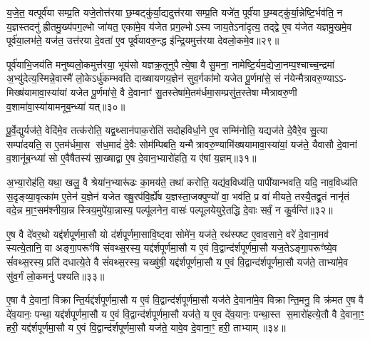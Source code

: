 य॒जे॒त॒ यत्पूर्व॑या सम्प्र॒ति यजे॒तोत्त॑रया छ॒म्बट्कु॑र्या॒द्यदुत्त॑रया सम्प्र॒ति यजे॑त॒ पूर्व॑या छ॒म्बट्कु॑र्या॒न्नेष्टि॒र्भव॑ति॒ न य॒ज्ञस्तदनु॑ ह्रीतमु॒ख्य॑पग॒ल्भो जा॑यत॒ एका॑मे॒व य॑जेत प्रग॒ल्भोऽस्य जाय॒तेऽना॑दृत्य॒ तद्द्वे ए॒व य॑जेत यज्ञमु॒खमे॒व पूर्व॑या॒लभ॑ते॒ यज॑त॒ उत्त॑रया दे॒वता॑ ए॒व पूर्व॑यावरु॒न्द्ध इ॑न्द्रि॒यमुत्त॑रया देवलो॒कमे॒व॥२९॥

पूर्व॑याभि॒जय॑ति मनुष्यलो॒कमुत्त॑रया॒ भूय॑सो यज्ञक्र॒तूनुपैत्ये॒षा वै सु॒मना॒ नामेष्टि॒र्यम॒द्येजा॒नम्प॒श्चाच्च॒न्द्रमा॑ अ॒भ्यु॑देत्य॒स्मिन्ने॒वास्मै॑ लो॒केऽर्धु॑कम्भवति दाख्षायणय॒ज्ञेन॑ सुव॒र्गका॑मो यजेत पू॒र्णमा॑से॒ सं न॑येन्मैत्रावरु॒ण्याऽऽ- मिख्ष॑यामावा॒स्या॑यां यजेत पू॒र्णमा॑से॒ वै दे॒वानाꣳ॑ सु॒तस्तेषा॑मे॒तम॑र्धमा॒सम्प्रसु॑त॒स्तेषाम्मैत्रावरु॒णी व॒शामा॑वा॒स्या॑यामनूब॒न्ध्या॑ यत्॥३०॥

पू॒र्वे॒द्युर्यज॑ते॒ वेदि॑मे॒व तत्क॑रोति॒ यद्व॒थ्सान॑पाक॒रोति॑ सदोहविर्धा॒ने ए॒व सम्मि॑नोति॒ यद्यज॑ते दे॒वैरे॒व सु॒त्या सम्पा॑दयति॒ स ए॒तम॑र्धमा॒स स॑ध॒मादं॑ दे॒वैः सोम॑म्पिबति॒ यन्मैत्रावरु॒ण्यामि॑ख्षयामावा॒स्या॑यां॒ यज॑ते॒ यैवासौ दे॒वानां व॒शानू॑ब॒न्ध्या॑ सो ए॒वैषैतस्य॑ सा॒ख्षाद्वा ए॒ष दे॒वान॒भ्यारो॑हति॒ य ए॑षां य॒ज्ञम्॥३१॥

अ॒भ्या॒रोह॑ति॒ यथा॒ खलु॒ वै श्रेया॑न॒भ्यारू॑ढः का॒मय॑ते॒ तथा॑ करोति॒ यद्य॑व॒विध्य॑ति॒ पापी॑यान्भवति॒ यदि॒ नाव॒विध्य॑ति स॒दृङ्व्या॒वृत्का॑म ए॒तेन॑ य॒ज्ञेन॑ यजेत ख्षु॒रप॑वि॒र्\mbox{}ह्ये॑ष य॒ज्ञस्ता॒जक्पुण्यो॑ वा॒ भव॑ति॒ प्र वा॑ मीयते॒ तस्यै॒तद्व्र॒तं नानृ॑तं वदे॒न्न मा॒ꣳ॒सम॑श्नीया॒न्न स्त्रिय॒मुपे॑या॒न्नास्य॒ पल्पू॑लनेन॒ वासः॑ पल्पूलयेयुरे॒तद्धि दे॒वाः सर्वं॒ न कु॒र्वन्ति॑॥३२॥

{\anuvakamend[{च॒न्द्रमा॒ द्वे दे॑वलो॒कमे॒व यद्य॒ज्ञं प॑ल्पूलयेयु॒ष्षट्च॑॥५॥}]}

ए॒ष वै दे॑वर॒थो यद्द॑र्\mbox{}शपूर्णमा॒सौ यो द॑र्\mbox{}शपूर्णमा॒सावि॒ष्ट्वा सोमे॑न॒ यज॑ते॒ रथ॑स्पष्ट ए॒वाव॒साने॒ वरे॑ दे॒वाना॒मव॑ स्यत्ये॒तानि॒ वा अङ्गा॒परूꣳ॑षि संवथ्स॒रस्य॒ यद्द॑र्\mbox{}शपूर्णमा॒सौ य ए॒वं वि॒द्वान्द॑र्\mbox{}शपूर्णमा॒सौ यज॒तेऽङ्गा॒परूꣳ॑ष्ये॒व सं॑वथ्स॒रस्य॒ प्रति॑ दधात्ये॒ते वै सं॑वथ्स॒रस्य॒ चख्षु॑षी॒ यद्द॑र्\mbox{}शपूर्णमा॒सौ य ए॒वं वि॒द्वान्द॑र्\mbox{}शपूर्णमा॒सौ यज॑ते॒ ताभ्या॑मे॒व सु॑व॒र्गं लो॒कमनु॑ पश्यति॥३३॥

ए॒षा वै दे॒वानां॒ विक्रान्ति॒र्यद्द॑र्\mbox{}शपूर्णमा॒सौ य ए॒वं वि॒द्वान्द॑र्\mbox{}शपूर्णमा॒सौ यज॑ते दे॒वाना॑मे॒व विक्रान्ति॒मनु॒ वि क्र॑मत ए॒ष वै दे॑व॒यानः॒ पन्था॒ यद्द॑र्\mbox{}शपूर्णमा॒सौ य ए॒वं वि॒द्वान्द॑र्\mbox{}शपूर्णमा॒सौ यज॑ते॒ य ए॒व दे॑व॒यानः॒ पन्था॒स्त स॒मारो॑हत्ये॒तौ वै दे॒वाना॒ꣳ॒ हरी॒ यद्द॑र्\mbox{}शपूर्णमा॒सौ य ए॒वं वि॒द्वान्द॑र्\mbox{}शपूर्णमा॒सौ यज॑ते॒ यावे॒व दे॒वाना॒ꣳ॒ हरी॒ ताभ्याम्॥३४॥


